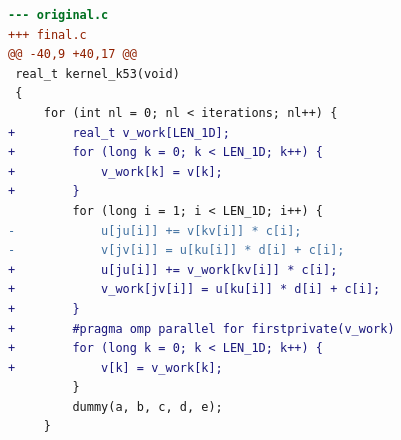 \begin{lstlisting}[language=diff,basicstyle=\ttfamily\scriptsize,breaklines=true,caption={tsvc_c2/k53 — BROKEN (e2v6_fb_3)}]
--- original.c
+++ final.c
@@ -40,9 +40,17 @@
 real_t kernel_k53(void)
 {
     for (int nl = 0; nl < iterations; nl++) {
+        real_t v_work[LEN_1D];
+        for (long k = 0; k < LEN_1D; k++) {
+            v_work[k] = v[k];
+        }
         for (long i = 1; i < LEN_1D; i++) {
-            u[ju[i]] += v[kv[i]] * c[i];
-            v[jv[i]] = u[ku[i]] * d[i] + c[i];
+            u[ju[i]] += v_work[kv[i]] * c[i];
+            v_work[jv[i]] = u[ku[i]] * d[i] + c[i];
+        }
+        #pragma omp parallel for firstprivate(v_work) 
+        for (long k = 0; k < LEN_1D; k++) {
+            v[k] = v_work[k];
         }
         dummy(a, b, c, d, e);
     }
\end{lstlisting}
